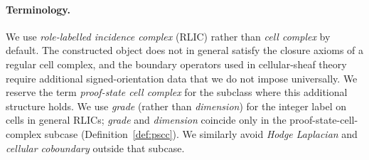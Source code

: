 \documentclass[11pt]{article}
\theoremstyle{definition}
\theoremstyle{plain}
\begin{document}
\paragraph{Terminology.} We use \emph{role-labelled incidence complex} (RLIC) rather than \emph{cell complex} by default. The constructed object does not in general satisfy the closure axioms of a regular cell complex, and the boundary operators used in cellular-sheaf theory require additional signed-orientation data that we do not impose universally. We reserve the term \emph{proof-state cell complex} for the subclass where this additional structure holds. We use \emph{grade} (rather than \emph{dimension}) for the integer label on cells in general RLICs; \emph{grade} and \emph{dimension} coincide only in the proof-state-cell-complex subcase (Definition~\ref{def:pscc}). We similarly avoid \emph{Hodge Laplacian} and \emph{cellular coboundary} outside that subcase.
\end{document}
